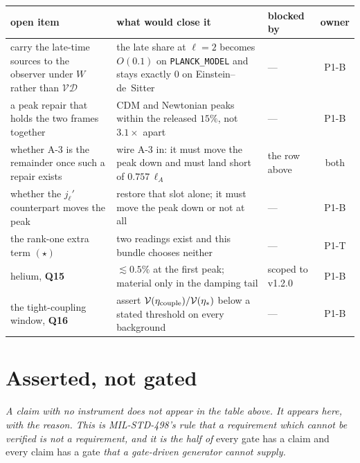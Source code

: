 \begin{center}\small
\begin{tabularx}{\textwidth}{@{}>{\raggedright\arraybackslash}X >{\raggedright\arraybackslash}X l c@{}}
\toprule
\textbf{open item} & \textbf{what would close it} & \textbf{blocked by} &
  \textbf{owner} \\
\midrule
carry the late-time sources to the observer under $W$ rather than
  $\mathcal V\mathcal D$ & the late share at $\ell=2$ becomes $O(0.1)$ on
  \texttt{PLANCK\_MODEL} and stays exactly $0$ on Einstein--de~Sitter & --- &
  P1-B \\
a peak repair that holds the two frames together & CDM and Newtonian peaks
  within the released $15\%$, not $3.1\times$ apart & --- & P1-B \\
whether A-3 is the remainder once such a repair exists & wire A-3 in: it must
  move the peak down and must land short of $0.757\,\ell_A$ & the row above &
  both \\
whether the $j_\ell'$ counterpart moves the peak & restore that slot alone; it
  must move the peak down or not at all & --- & P1-B \\
the rank-one extra term $(\star)$ & two readings exist and this bundle chooses
  neither & --- & P1-T \\
helium, \textbf{Q15} & $\lesssim0.5\%$ at the first peak; material only in the
  damping tail & scoped to v1.2.0 & P1-B \\
the tight-coupling window, \textbf{Q16} & assert
  $\mathcal V(\eta_{\rm couple})/\mathcal V(\eta_*)$ below a stated threshold
  on every background & --- & P1-B \\
\bottomrule
\end{tabularx}
\end{center}

\section{Asserted, not gated}
\label{sec:asserted-not-gated}

\emph{A claim with no instrument does not appear in the table above. It appears
here, with the reason. This is MIL-STD-498's rule that a requirement which
cannot be verified is not a requirement, and it is the half of} every gate has
a claim and every claim has a gate \emph{that a gate-driven generator cannot
supply.}

